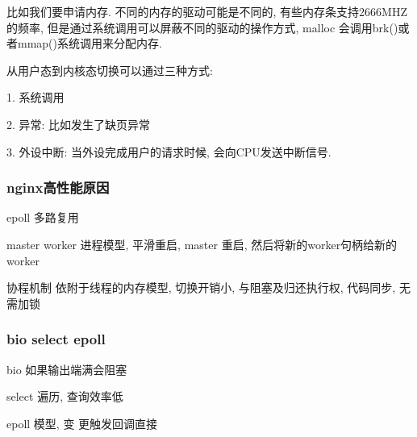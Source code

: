 比如我们要申请内存. 不同的内存的驱动可能是不同的, 有些内存条支持2666MHZ的频率, 但是通过系统调用可以屏蔽不同的驱动的操作方式, malloc 会调用brk()或者mmap()系统调用来分配内存.

从用户态到内核态切换可以通过三种方式:

1. 系统调用

2. 异常: 比如发生了缺页异常

3. 外设中断: 当外设完成用户的请求时候, 会向CPU发送中断信号.

\subsubsection{nginx高性能原因}
epoll 多路复用

master worker 进程模型, 平滑重启, master 重启, 然后将新的worker句柄给新的worker

协程机制 依附于线程的内存模型, 切换开销小, 与阻塞及归还执行权, 代码同步, 无需加锁

\subsubsection{bio select epoll}
bio 如果输出端满会阻塞

select  遍历, 查询效率低

epoll 模型, 变 更触发回调直接


